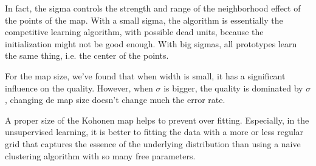 \documentclass[a4paper, 12pt]{article}
\begin{document}
In fact, the sigma controls the strength and range of the neighborhood effect of the points of the map. With a small sigma, the algorithm is essentially the competitive learning algorithm, with possible dead units, because the initialization might not be good enough. With big sigmas, all prototypes learn the same thing, i.e. the center of the points.

For the map size, we've found that when width is small, it has a
significant influence on the quality. However, when $\sigma$ is
bigger, the quality is dominated by $\sigma$, changing de map
size doesn't change much the error rate.

A proper size of the Kohonen map helps to prevent over fitting. Especially, in the unsupervised learning, it is better to fitting the data with a more or less regular grid that captures the essence of the underlying distribution than using a naive clustering algorithm with so many free parameters.
\end{document}
